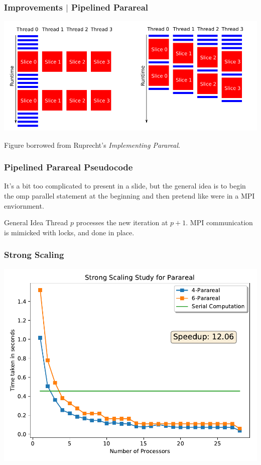 \documentclass[pdf,12pt]{beamer}
\begin{document}
\begin{frame}
  \frametitle{Improvements $\mid$ Pipelined Parareal}
  \begin{center}
    \includegraphics[width=\textwidth]{./resources/pipelined_parareal}
  \end{center}
  Figure borrowed from Ruprecht's \textit{Implementing Parareal}.
\end{frame}

\begin{frame}
  \frametitle{Pipelined Parareal Pseudocode}
  It's a bit too complicated to present in a slide, but the general idea is to
  begin the omp parallel statement at the beginning and then pretend like were
  in a MPI enviornment.
  \begin{block}{General Idea}
    Thread $p$ processes the new iteration at $p+1$. MPI communication is
    mimicked with locks, and done in place.
  \end{block}
\end{frame}

\begin{frame}
  \frametitle{Strong Scaling}
  \begin{center}
    \includegraphics[width=.8\textwidth]{./resources/strong_scaling}
  \end{center}
\end{frame}
\end{document}
